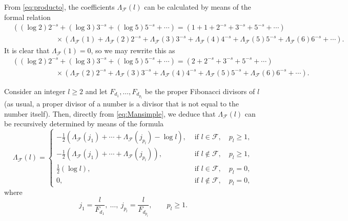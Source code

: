 \documentclass[11pt, a4paper]{article}
\renewcommand{\Re}{\operatorname{Re}}
\newcommand{\calF}{\mathcal{F}}
\newcommand{\manF}{\Lambda_{\mathcal{F}}}
\theoremstyle{plain}
\theoremstyle{definition}
\begin{document}

From \eqref{eq:producto}, the coefficients $\manF(l)$ can be calculated by means of the
formal relation 
\[
\begin{aligned}
&\left( (\log 2) 2^{-s} + (\log 3) 3^{-s} + (\log 5) 5^{-s} + \cdots \right) 
= \left( 1+1+2^{-s}+3^{-s}+5^{-s}+\cdots\right) 
\\
&\qquad\qquad\qquad \times \left( \manF(1) + \manF(2)2^{-s} + \manF(3)3^{-s}
+ \manF(4)4^{-s} + \manF(5)5^{-s} + \manF(6)6^{-s}+\cdots\right) .
\end{aligned}
\]
It is clear that $\manF(1)=0$, so we may rewrite this as
\begin{equation}
\label{eq:Mansimple}
\begin{aligned}
&\left( (\log 2) 2^{-s} + (\log 3) 3^{-s} + (\log 5) 5^{-s} + \cdots\right) 
= \left( 2+2^{-s}+3^{-s}+5^{-s}+\cdots\right) 
\\
&\qquad\qquad\qquad \times \left( \manF(2)2^{-s} + \manF(3)3^{-s} + \manF(4)4^{-s}
+ \manF(5)5^{-s} + \manF(6)6^{-s} + \cdots \right) . 
\end{aligned}
\end{equation}

Consider an integer $l\ge 2$ and let $F_{d_1},\dots, F_{d_{p_l}}$ be the proper Fibonacci divisors of $l$ (as usual, a proper divisor of a number is a divisor that 
is not equal to the number itself). Then, directly from \eqref{eq:Mansimple}, 
we deduce that $\manF(l)$ can be recursively determined by means of the formula
\begin{equation}
\label{eq:Man(l)rec}
\manF(l) = 
\begin{cases}
-\frac{1}{2} (\manF(j_1) + \cdots + \manF(j_{p_l}) - \log l),
& \text{ if } l\in \calF, \quad p_{l} \geq 1, \\ 
-\frac{1}{2}(\manF(j_1) + \cdots + \manF(j_{p_l})),
& \text{ if } l\notin \calF, \quad p_{l} \geq 1, \\ 
\frac{1}{2} (\log l),
& \text{ if } l\in \calF, \quad p_{l} = 0, \\ 
0,
& \text{ if } l\notin \calF, \quad p_{l} = 0,
\end{cases}
\end{equation}
where
\[
j_1 = \frac{l}{F_{d_1}},\ \dots,\
j_{p_l} = \frac{l}{F_{d_{p_l}}}, \qquad p_{l} \geq 1.
\]
\end{document}
